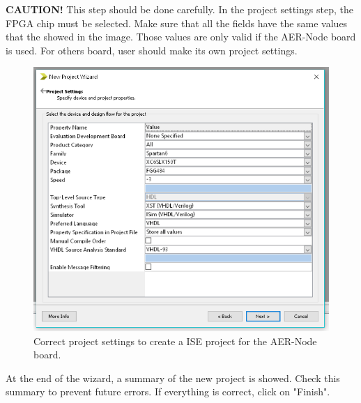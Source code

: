 \textbf{CAUTION!} This step should be done carefully. In the project settings step, the FPGA chip must be selected. Make sure that all the fields have the same values that the showed in the image. Those values are only valid if the AER-Node board is used. For others board, user should make its own project settings. 

\begin{figure}[H]
\centering
\includegraphics[width=1\textwidth]{images/Img31_NewProject_FPGA_conf.PNG}
\caption{\label{fig:ISE_project_settings}Correct project settings to create a ISE project for the AER-Node board.}
\end{figure}

At the end of the wizard, a summary of the new project is showed. Check this summary to prevent future errors. If everything is correct, click on "Finish".

